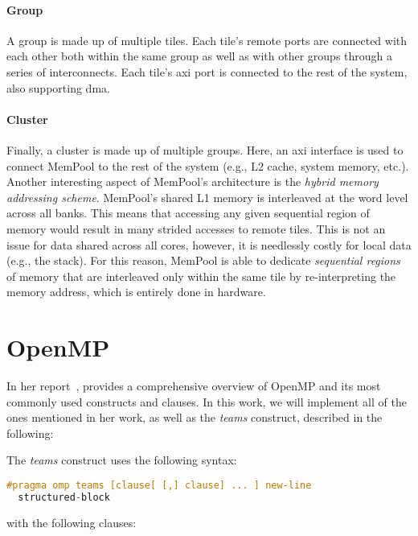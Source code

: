 \paragraph{Group} A group is made up of multiple tiles. Each tile's remote ports are connected with
each other both within the same group as well as with other groups through a series of
interconnects. Each tile's \gls{axi} port is connected to the rest of the system, also supporting
\gls{dma}.

\paragraph{Cluster} Finally, a cluster is made up of multiple groups. Here, an \gls{axi} interface
is used to connect MemPool to the rest of the system (e.g., L2 cache, system memory, etc.).
\\

Another interesting aspect of MemPool's architecture is the \emph{hybrid memory addressing scheme}.
MemPool's shared L1 memory is interleaved at the word level across all banks. This means that
accessing any given sequential region of memory would result in many strided accesses to remote
tiles. This is not an issue for data shared across all cores, however, it is needlessly costly for
local data (e.g., the stack). For this reason, MemPool is able to dedicate \emph{sequential regions}
of memory that are interleaved only within the same tile by re-interpreting the memory address,
which is entirely done in hardware.

\section{OpenMP}
\label{sec:openmp}

In her report~\cite{herokmp}, \citeauthor{herokmp} provides a comprehensive overview of OpenMP and
its most commonly used constructs and clauses. In this work, we will implement all of the ones
mentioned in her work, as well as the \emph{teams} construct, described in the following:

The \emph{teams} construct uses the following syntax:

\begin{lstlisting}[language=C, caption={teams construct}, label={lst:teams}]
#pragma omp teams [clause[ [,] clause] ... ] new-line
  structured-block
\end{lstlisting}

with the following clauses:

